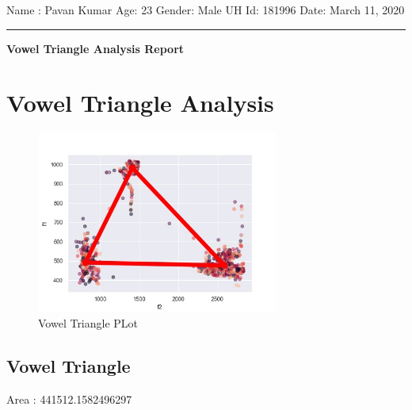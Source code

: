 \documentclass{article}%
\begin{document}
%
\normalsize%
\begin{minipage}{\textwidth}%
\flushleft%
Name : Pavan Kumar%
\newline%
Age: 23%
\newline%
Gender: Male%
\newline%
UH Id: 181996%
\newline%
Date: March 11, 2020%
\linebreak%
\noindent\rule{\textwidth}{1pt}%
\newline%
\linebreak%
\begin{minipage}{\textwidth}%
\centering%
\begin{Large}%
\textbf{Vowel Triangle Analysis Report}%
\end{Large}%
\end{minipage}%
\end{minipage}%
\section{Vowel Triangle Analysis}%
\label{sec:VowelTriangleAnalysis}%


\begin{figure}[h!]%
\centering%
\includegraphics[width=300px]{vowel_triangle.jpg}%
\caption{Vowel Triangle PLot}%
\end{figure}

%
\subsection{Vowel Triangle}%
\label{subsec:VowelTriangle}%
Area : 441512.1582496297

%
\pagebreak[4]

%
\end{document}

